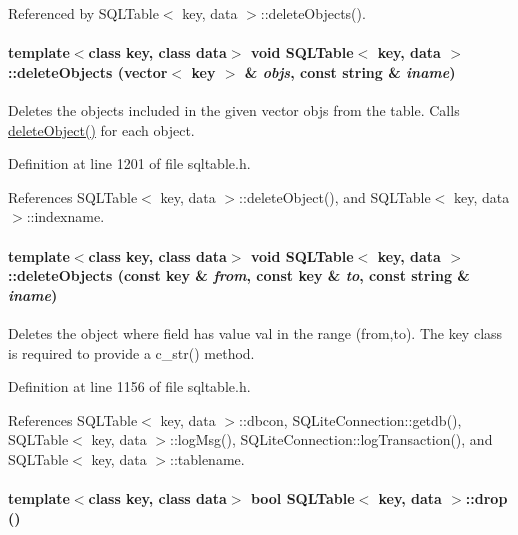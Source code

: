 Referenced by SQLTable$<$ key, data $>$::delete\-Objects().\hypertarget{classSQLTable_SQLTablea24}{
\paragraph[deleteObjects]{\setlength{\rightskip}{0pt plus 5cm}template$<$class key, class data$>$ void SQLTable$<$ key, data $>$::delete\-Objects (vector$<$ key $>$ \& {\em objs}, const string \& {\em iname})}\hfill}
\label{classSQLTable_SQLTablea24}


Deletes the objects included in the given vector objs from the table. Calls \hyperlink{classSQLTable_SQLTablea22}{delete\-Object()} for each object. 

Definition at line 1201 of file sqltable.h.

References SQLTable$<$ key, data $>$::delete\-Object(), and SQLTable$<$ key, data $>$::indexname.\hypertarget{classSQLTable_SQLTablea23}{
\paragraph[deleteObjects]{\setlength{\rightskip}{0pt plus 5cm}template$<$class key, class data$>$ void SQLTable$<$ key, data $>$::delete\-Objects (const key \& {\em from}, const key \& {\em to}, const string \& {\em iname})}\hfill}
\label{classSQLTable_SQLTablea23}


Deletes the object where field has value val in the range (from,to). The key class is required to provide a c\_\-str() method. 

Definition at line 1156 of file sqltable.h.

References SQLTable$<$ key, data $>$::dbcon, SQLite\-Connection::getdb(), SQLTable$<$ key, data $>$::log\-Msg(), SQLite\-Connection::log\-Transaction(), and SQLTable$<$ key, data $>$::tablename.\hypertarget{classSQLTable_SQLTablea6}{
\paragraph[drop]{\setlength{\rightskip}{0pt plus 5cm}template$<$class key, class data$>$ bool SQLTable$<$ key, data $>$::drop ()}\hfill}
\label{classSQLTable_SQLTablea6}


